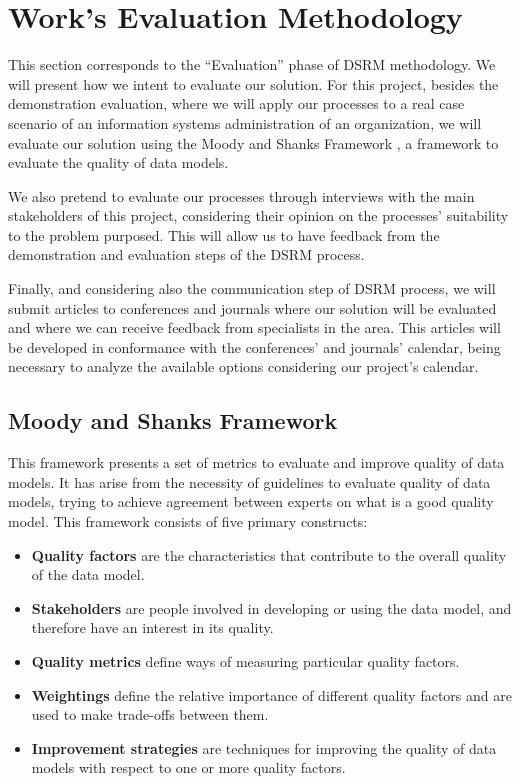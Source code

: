 
% 
% 

\section{Work's Evaluation Methodology}

This section corresponds to the ``Evaluation'' phase of DSRM methodology. We will present how we intent to evaluate our solution. For this project, besides the demonstration evaluation, where we will apply our processes to a real case scenario of an information systems administration of an organization, we will evaluate our solution using the Moody and Shanks Framework \cite{moody2003improving}, a framework to evaluate the quality of data models.\par
We also pretend to evaluate our processes through interviews with the main stakeholders of this project, considering their opinion on the processes' suitability to the problem purposed. This will allow us to have feedback from the demonstration and evaluation steps of the DSRM process.\par
Finally, and considering also the communication step of DSRM process, we will submit articles to conferences and journals where our solution will be evaluated and where we can receive feedback from specialists in the area. This articles will be developed in conformance with the conferences' and journals' calendar, being necessary to analyze the available options considering our project's calendar.\par

\subsection{Moody and Shanks Framework}

This framework presents a set of metrics to evaluate and improve quality of data models. It has arise from the necessity of guidelines to evaluate quality of data models, trying to achieve agreement between experts on what is a good quality model. This framework consists of five primary constructs:

\begin{itemize}
\item \textbf{Quality factors} are the characteristics that contribute to the overall quality of the data model.
\item \textbf{Stakeholders} are people involved in developing or using the data model, and therefore have an interest in its quality.
\item \textbf{Quality metrics} define ways of measuring particular quality factors.
\item \textbf{Weightings} define the relative importance of different quality factors and are used to make trade-offs between them.
\item \textbf{Improvement strategies} are techniques for improving the quality of data models with respect to one or more quality factors.
\end{itemize}

